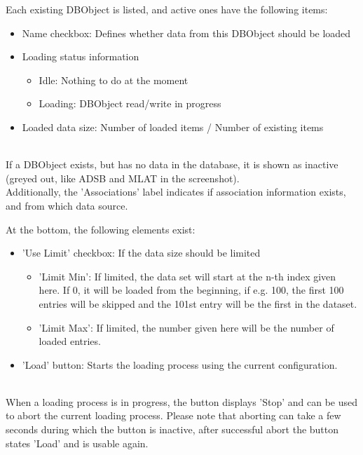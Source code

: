 Each existing DBObject is listed, and active ones have the following items:

\begin{itemize}
 \item Name checkbox: Defines whether data from this DBObject should be loaded
 \item Loading status information
  \begin{itemize}
  \item Idle: Nothing to do at the moment
  \item Loading: DBObject read/write in progress
  \end{itemize}
 \item Loaded data size: Number of loaded items / Number of existing items
\end{itemize}
\ \\

If a DBObject exists, but has no data in the database, it is shown as inactive (greyed out, like ADSB and MLAT in the screenshot).\\

Additionally, the 'Associations' label indicates if association information exists, and from which data source.



At the bottom, the following elements exist:

\begin{itemize}
 \item 'Use Limit' checkbox: If the data size should be limited
 \begin{itemize}
 \item 'Limit Min': If limited, the data set will start at the n-th index given here. If 0, it will be loaded from the beginning, if e.g. 100, the first 100 entries will be skipped and the 101st entry will be the first in the dataset.
\item 'Limit Max': If limited, the number given here will be the number of loaded entries.
\end{itemize}
\item 'Load' button: Starts the loading process using the current configuration.
\end{itemize}
\ \\

When a loading process is in progress, the button displays 'Stop' and can be used to abort the current loading process. Please note that aborting can take a few seconds during which the button is inactive, after successful abort the button states 'Load' and is usable again.

